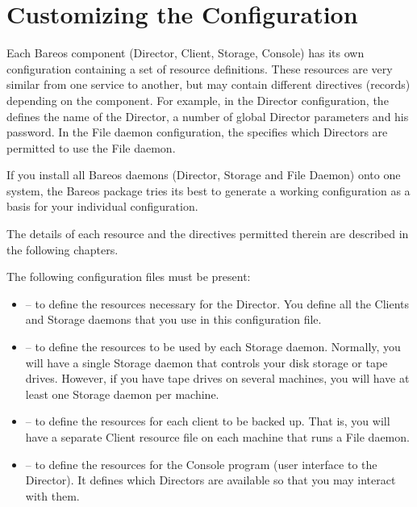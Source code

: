 \chapter{Customizing the Configuration}
\label{ConfigureChapter}

Each Bareos component (Director, Client, Storage, Console) has its own configuration
containing a set of resource definitions. These resources are very
similar from one service to another, but may contain different directives
(records) depending on the component. For example, in the Director configuration,
the  defines the name of the Director, a number
of global Director parameters and his password. In the File daemon
configuration, the  specifies which Directors are
permitted to use the File daemon.

If you install all Bareos daemons (Director, Storage and File Daemon) onto one system,
the Bareos package tries its best to generate a working configuration as a basis for your individual configuration.

The details of each resource and the directives permitted therein are
described in the following chapters.

The following configuration files must be present:

\begin{itemize}
\item
    -- to define the resources
   necessary for the Director. You define all the Clients  and Storage daemons
   that you use in this configuration file.
\item
    -- to define the resources to
   be used by each Storage daemon. Normally, you will have a single Storage
   daemon that controls your disk storage or tape drives. However, if you have
   tape drives on several machines, you will have at least one Storage daemon
   per machine.
\item
    -- to define the resources for
   each client to be backed up. That is, you will have a separate  Client
   resource file on each machine that runs a File daemon.
\item
    -- to define the resources for
   the Console program (user interface to the Director).  It defines which
Directors are  available so that you may interact with them.
\end{itemize}


